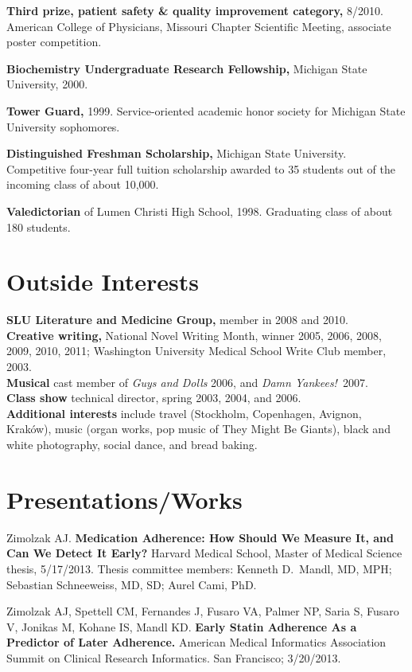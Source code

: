 \documentclass[12pt]{article}
\begin{document}
\textbf{Third prize, patient safety \& quality improvement category,} 8/2010.
American College of Physicians, Missouri Chapter Scientific Meeting,
associate poster competition.

\textbf{Biochemistry Undergraduate Research Fellowship,} Michigan State
University, 2000.

\textbf{Tower Guard,} 1999. Service-oriented academic honor
society for Michigan State University sophomores.

\textbf{Distinguished Freshman Scholarship,} Michigan State
University. Competitive four-year full tuition scholarship awarded to
35 students out of the incoming class of about 10,000.

\textbf{Valedictorian} of Lumen Christi High School, 1998. Graduating
class of about 180 students.

\section*{Outside Interests}

\textbf{SLU Literature and Medicine Group,} member in 2008 and 2010.\\
\textbf{Creative writing,} National Novel Writing Month, winner 2005, 2006,
2008, 2009, 2010, 2011; Washington University Medical School Write Club
member, 2003.\\
\textbf{Musical} cast member of \emph{Guys and Dolls} 2006, and
\emph{Damn Yankees!}\ 2007.\\
\textbf{Class show} technical director, spring 2003, 2004, and 2006.\\
\textbf{Additional interests} include travel (Stockholm, Copenhagen, Avignon,
Krak\'ow), music (organ works, pop music of They Might Be Giants), black
and white photography, social dance, and bread baking.

\section*{Presentations/Works}
Zimolzak AJ. \textbf{Medication Adherence: How Should We Measure It, and Can
We Detect It Early?} Harvard Medical School, Master of Medical Science
thesis, 5/17/2013. Thesis committee members: Kenneth D.\ Mandl, MD,
MPH; Sebastian Schneeweiss, MD, SD; Aurel Cami, PhD.

Zimolzak AJ, Spettell CM, Fernandes J, Fusaro VA, Palmer NP, Saria S,
Fusaro V, Jonikas M, Kohane IS, Mandl KD. \textbf{Early Statin
  Adherence As a Predictor of Later Adherence.} American Medical
Informatics Association Summit on Clinical Research Informatics. San
Francisco; 3/20/2013.
\end{document}
